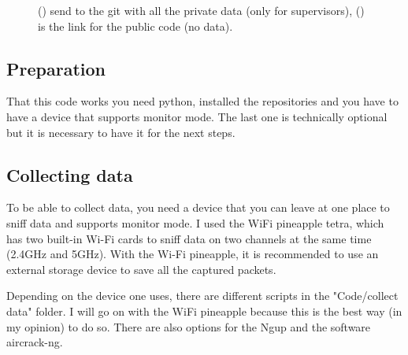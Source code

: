 \documentclass[11pt]{article}
\begin{document}
\begin{figure}[ht]
\begin{subfigure}[b]{0.45\linewidth}
\centering\caption{\label{fig:qrgithub}}
\end{subfigure}
\caption{() send to the git with all the private data (only for supervisors), () is the link for the public code (no data).}
\end{figure}
\subsection{Preparation}
That this code works you need python, installed the repositories and you have to have a device that supports monitor mode. The last one is technically optional but it is necessary to have it for the next steps.
\subsection{Collecting data}
To be able to collect data, you need a device that you can leave at one place to sniff data and supports monitor mode. I used the WiFi pineapple tetra, which has two built-in Wi-Fi cards to sniff data on two channels at the same time (2.4GHz and 5GHz).
With the Wi-Fi pineapple, it is recommended to use an external storage device to save all the captured packets.

Depending on the device one uses, there are different scripts in the "Code/collect data" folder. I will go on with the WiFi pineapple because this is the best way (in my opinion) to do so.
There are also options for the Ngup and the software aircrack-ng.
\end{document}
